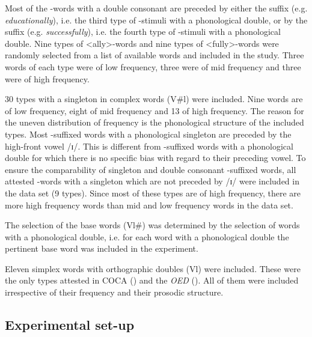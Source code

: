 Most of the -words with a double consonant are preceded by either the suffix  (e.g. \textit{educationally}), i.e. the third type of -stimuli with a phonological double, or by the suffix  (e.g. \textit{successfully}), i.e. the fourth type of -stimuli with a phonological double. Nine types of <ally>-words and nine types of <fully>-words were randomly selected from a list of available words and included in the study. Three words of each type were of low frequency, three were of mid frequency and three were of high frequency.



30 types with a singleton in complex words (V\#l) were included. Nine words are of low frequency, eight of mid frequency and 13 of high frequency. The reason for the uneven distribution of frequency is the phonological structure of the included types. Most -suffixed words with a phonological singleton are preceded by the high-front vowel /ɪ/. This is different from -suffixed words with a phonological double for which there is no specific bias with regard to their preceding vowel. To ensure the comparability of singleton and double consonant -suffixed words, all attested -words with a singleton which are not preceded by /ɪ/ were included in the data set (9 types). Since most of these types are of high frequency, there are more high frequency words than mid and low frequency words in the data set. %






The selection of the base words (Vl\#) was determined by the selection of words with a phonological double, i.e.  for each word with a phonological double the pertinent base word was included in the experiment. 

Eleven simplex words with orthographic doubles (Vl) were included. These were the only types attested in COCA (\citealt{Davies.20082014}) and the \textit{OED} (\citealt{OED.2013}). 
All of them were included irrespective of their frequency and their prosodic structure. 





\subsection{Experimental set-up}

